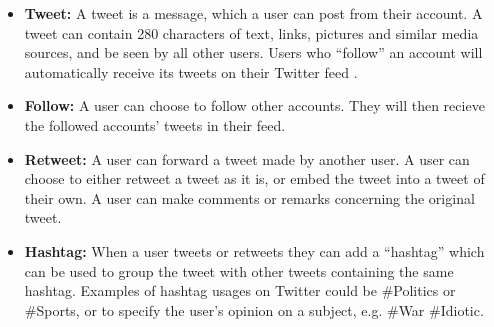 \begin{itemize}
  \item \textbf{Tweet:} A tweet is a message, which a user can post from their
  account. A tweet can contain 280 characters \citep{Tweet280} of text, links,
  pictures and similar media sources, and be seen by all other users. Users who
  ``follow'' an account will automatically receive its tweets on their Twitter
  feed \citep{StartingTwitter2}.
  \item \textbf{Follow:} A user can choose to follow other accounts. 
  They will then recieve the followed accounts' tweets in their feed.
  \item \textbf{Retweet:} A user can forward a tweet made by another user.
  A user can choose to either retweet a tweet as it is, or embed the tweet into
  a tweet of their own. A user can make comments or remarks concerning the
  original tweet.
  \item \textbf{Hashtag:} When a user tweets or retweets they can add a
  ``hashtag'' which can be used to group the tweet with other tweets
  containing the same hashtag. Examples of hashtag usages on Twitter could be
  \#Politics or \#Sports, or to specify the user's opinion on a subject, e.g.
  \#War \#Idiotic.
\end{itemize}

% 
% 
% 

